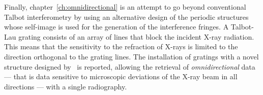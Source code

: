 Finally, chapter~\ref{ch:omnidirectional} is an attempt to go beyond
conventional Talbot interferometry by using an alternative design of the
periodic structures whose self-image is used for the generation of the
interference fringes. A Talbot-Lau grating consists of an array of lines that block the
incident X-ray radiation. This means that the sensitivity to the refraction
of X-rays is limited to the
direction orthogonal to
the grating lines. The installation of gratings with a novel structure
designed by~\cite{PhysRevLett.116.093902} is
reported, allowing the retrieval of \emph{omnidirectional} data --- that is
data sensitive to microscopic deviations of the X-ray beam in all directions
--- with a single radiography.
